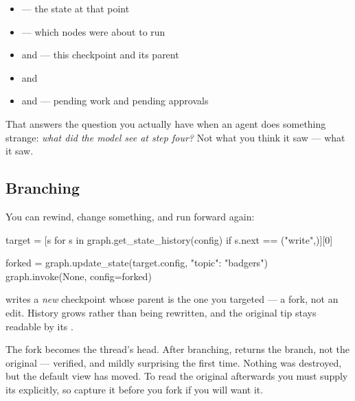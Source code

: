 \begin{itemize}[leftmargin=1.4em,nosep]
\item {} --- the state at that point
\item {} --- which nodes were about to run
\item {} and  --- this checkpoint and its parent
\item {} and 
\item {} and  --- pending work and pending approvals
\end{itemize}

That answers the question you actually have when an agent does something strange:
\emph{what did the model see at step four?} Not what you think it saw --- what it
saw.

\subsection{Branching}
\label{sec:branching}

You can rewind, change something, and run forward again:

\begin{python}[caption={A what-if}, label={lst:branch}]
target = [s for s in graph.get_state_history(config) if s.next == ("write",)][0]

forked = graph.update_state(target.config, {"topic": "badgers"})
graph.invoke(None, config=forked)
\end{python}

\begin{console}
\end{console}


 writes a \emph{new} checkpoint whose parent is the one you
targeted --- a fork, not an edit. History grows rather than being rewritten, and
the original tip stays readable by its .

\begin{warning}
The fork becomes the thread's head. After branching,
 returns the branch, not the original ---
verified, and mildly surprising the first time. Nothing was destroyed, but the
default view has moved. To read the original afterwards you must supply its
 explicitly, so capture it before you fork if you will want
it.
\end{warning}

